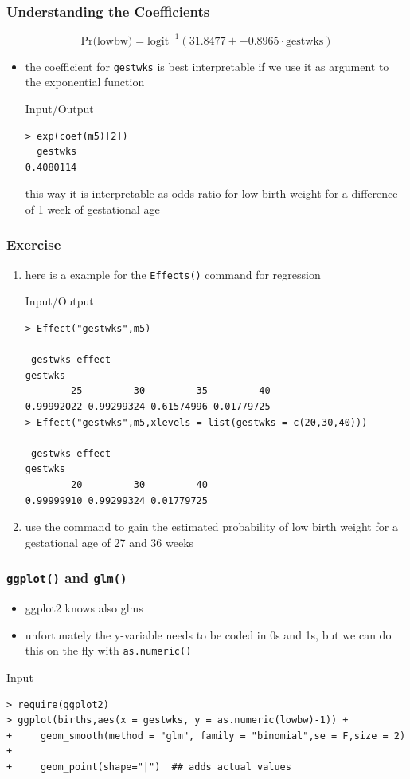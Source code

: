 \begin{frame}[fragile]\frametitle{Understanding the Coefficients}
$$\mbox{Pr(lowbw)}=\mbox{logit}^{-1}(31.8477 + -0.8965 \cdot \mbox{gestwks}) $$
\begin{itemize}
\item the coefficient for \texttt{gestwks} is best interpretable if we use it as argument to the exponential function
  \begin{exampleblock}{Input/Output}
\begin{verbatim}
> exp(coef(m5)[2])
  gestwks 
0.4080114 
\end{verbatim}
  \end{exampleblock}
this way it is interpretable as odds ratio for low birth weight for a difference of 1 week of gestational age
\end{itemize}
\end{frame}


\begin{frame}[fragile]\frametitle{Exercise}
  \begin{enumerate}
  \item here is a example for the \texttt{Effects()} command for regression
    \begin{exampleblock}{Input/Output}\scriptsize
\begin{verbatim}
> Effect("gestwks",m5)

 gestwks effect
gestwks
        25         30         35         40 
0.99992022 0.99299324 0.61574996 0.01779725 
> Effect("gestwks",m5,xlevels = list(gestwks = c(20,30,40)))

 gestwks effect
gestwks
        20         30         40 
0.99999910 0.99299324 0.01779725   
\end{verbatim}
    \end{exampleblock}\normalsize
\item use the command to gain the estimated probability of low birth weight for a gestational age of 27 and 36 weeks
  \end{enumerate}
\end{frame}


\begin{frame}[fragile]\frametitle{\texttt{ggplot()} and \texttt{glm()}}
  \begin{itemize}
  \item ggplot2 knows also glms
  \item unfortunately the y-variable needs to be coded in 0s and 1s, but we can do this on the fly with \texttt{as.numeric()}
  \end{itemize}
  \begin{exampleblock}{Input}\scriptsize
\begin{verbatim}
> require(ggplot2)
> ggplot(births,aes(x = gestwks, y = as.numeric(lowbw)-1)) +
+     geom_smooth(method = "glm", family = "binomial",se = F,size = 2) +
+     geom_point(shape="|")  ## adds actual values  
\end{verbatim}
  \end{exampleblock}
\end{frame}


